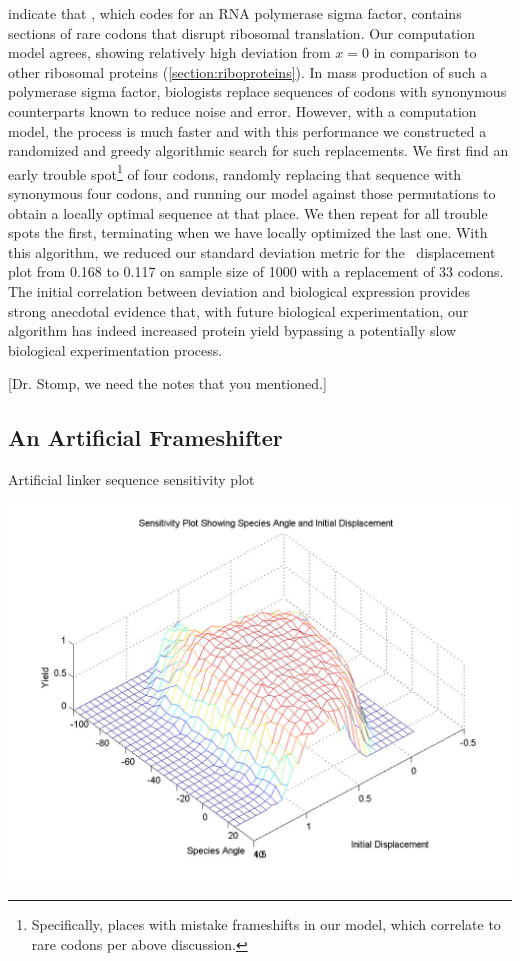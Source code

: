 \documentclass[12pt, draft]{article}
\numberwithin{equation}{section}
\begin{document}
\citet{rpoS:process} indicate that \rpoS, which codes for an RNA
polymerase sigma factor, contains sections of rare codons that disrupt
ribosomal translation. Our computation model agrees, showing
relatively high deviation from $x = 0$ in comparison to other
ribosomal proteins (\autoref{section:riboproteins}). In mass
production of such a polymerase sigma factor, biologists replace
sequences of codons with synonymous counterparts known to reduce noise
and error. However, with a computation model, the process is much
faster and with this performance we constructed a randomized and greedy
algorithmic search for such replacements. We first find an
early trouble spot\footnote{Specifically, places with mistake
  frameshifts in our model, which correlate to rare codons per above
  discussion.} of four codons, randomly replacing that sequence with
synonymous four codons, and running our model against those
permutations to obtain a locally optimal sequence at that place. We
then repeat for all trouble spots the first, terminating when we have
locally optimized the last one. With this algorithm, we reduced our
standard deviation metric for the \rpoS\ displacement plot from 0.168
to 0.117 on sample size of 1000 with a replacement of 33 codons. The
initial correlation between deviation and biological expression
provides strong anecdotal evidence that, with future biological
experimentation, our algorithm has indeed increased protein yield
bypassing a potentially slow biological experimentation process.

[Dr. Stomp, we need the notes that you mentioned.]

\subsection{An Artificial Frameshifter}
\begin{cfigure}
  \caption{Artificial linker sequence sensitivity plot}
  \label{linker:sens}
  \includegraphics[scale=0.25]{linker/sensitivity}
\end{cfigure}
\end{document}
